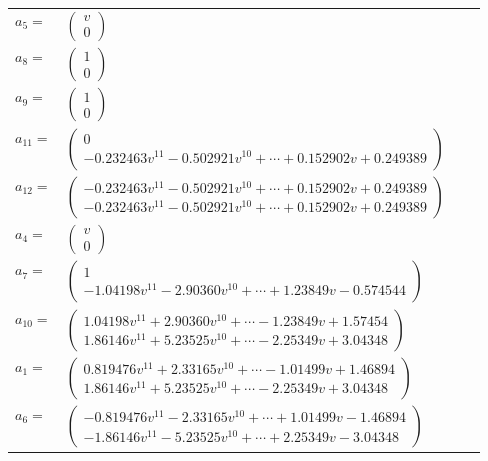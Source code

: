 \documentclass[1p]{elsarticle_modified}
\theoremstyle{definition}
\begin{document}
\begin{tabular}{m{7pt} m{180pt} m{7pt} m{180pt} }
\flushright $a_{5}=$&$\begin{pmatrix}v\\0\end{pmatrix}$ \\
\flushright $a_{8}=$&$\begin{pmatrix}1\\0\end{pmatrix}$ \\
\flushright $a_{9}=$&$\begin{pmatrix}1\\0\end{pmatrix}$ \\
\flushright $a_{11}=$&$\begin{pmatrix}0\\-0.232463 v^{11}-0.502921 v^{10}+\cdots+0.152902 v+0.249389\end{pmatrix}$ \\
\flushright $a_{12}=$&$\begin{pmatrix}-0.232463 v^{11}-0.502921 v^{10}+\cdots+0.152902 v+0.249389\\-0.232463 v^{11}-0.502921 v^{10}+\cdots+0.152902 v+0.249389\end{pmatrix}$ \\
\flushright $a_{4}=$&$\begin{pmatrix}v\\0\end{pmatrix}$ \\
\flushright $a_{7}=$&$\begin{pmatrix}1\\-1.04198 v^{11}-2.90360 v^{10}+\cdots+1.23849 v-0.574544\end{pmatrix}$ \\
\flushright $a_{10}=$&$\begin{pmatrix}1.04198 v^{11}+2.90360 v^{10}+\cdots-1.23849 v+1.57454\\1.86146 v^{11}+5.23525 v^{10}+\cdots-2.25349 v+3.04348\end{pmatrix}$ \\
\flushright $a_{1}=$&$\begin{pmatrix}0.819476 v^{11}+2.33165 v^{10}+\cdots-1.01499 v+1.46894\\1.86146 v^{11}+5.23525 v^{10}+\cdots-2.25349 v+3.04348\end{pmatrix}$ \\
\flushright $a_{6}=$&$\begin{pmatrix}-0.819476 v^{11}-2.33165 v^{10}+\cdots+1.01499 v-1.46894\\-1.86146 v^{11}-5.23525 v^{10}+\cdots+2.25349 v-3.04348\end{pmatrix}$ \\

\end{tabular}
\end{document}
